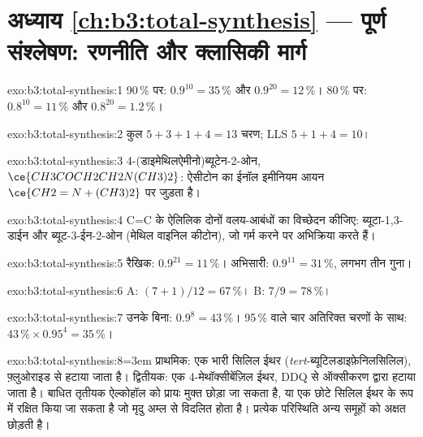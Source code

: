 \section*{अध्याय \ref{ch:b3:total-synthesis} --- पूर्ण संश्लेषण: रणनीति और क्लासिकी मार्ग}

\begin{solution}{exo:b3:total-synthesis:1}
90\,\% पर: $0.9^{10} = 35$\,\% और $0.9^{20} = 12$\,\%। 80\,\% पर: $0.8^{10} = 11$\,\% और $0.8^{20} = 1.2$\,\%।
\end{solution}

\begin{solution}{exo:b3:total-synthesis:2}
कुल $5 + 3 + 1 + 4 = 13$ चरण; LLS $5 + 1 + 4 = 10$।
\end{solution}

\begin{solution}{exo:b3:total-synthesis:3}
4-(डाइमेथिलऐमीनो)ब्यूटेन-2-ओन, $\ce{CH3COCH2CH2N(CH3)2}$: ऐसीटोन का ईनॉल इमीनियम
आयन $\ce{CH2=N+(CH3)2}$ पर जुड़ता है।
\end{solution}

\begin{solution}{exo:b3:total-synthesis:4}
C=C के ऐलिलिक दोनों वलय-आबंधों का विच्छेदन कीजिए: ब्यूटा-1,3-डाईन और ब्यूट-3-ईन-2-ओन
(मेथिल वाइनिल कीटोन), जो गर्म करने पर अभिक्रिया करते हैं।
\end{solution}

\begin{solution}{exo:b3:total-synthesis:5}
रैखिक: $0.9^{21} = 11$\,\%। अभिसारी: $0.9^{11} = 31$\,\%, लगभग तीन गुना।
\end{solution}

\begin{solution}{exo:b3:total-synthesis:6}
A: $(7 + 1)/12 = 67$\,\%। B: $7/9 = 78$\,\%।
\end{solution}

\begin{solution}{exo:b3:total-synthesis:7}
उनके बिना: $0.9^8 = 43$\,\%। 95\,\% वाले चार अतिरिक्त चरणों के साथ: $43\,\% \times 0.95^4 = 35$\,\%।
\end{solution}

\begin{solution}{exo:b3:total-synthesis:8}\emergencystretch=3em
प्राथमिक: एक भारी सिलिल ईथर (\textit{tert}-ब्यूटिलडाइफ़ेनिलसिलिल), फ़्लुओराइड से हटाया जाता है।
द्वितीयक: एक 4-मेथॉक्सीबेंज़िल ईथर, DDQ से ऑक्सीकरण द्वारा हटाया जाता है। बाधित
तृतीयक ऐल्कोहॉल को प्रायः मुक्त छोड़ा जा सकता है, या एक छोटे सिलिल ईथर के रूप में रक्षित
किया जा सकता है जो मृदु अम्ल से विदलित होता है। प्रत्येक परिस्थिति अन्य समूहों को अक्षत छोड़ती है।
\end{solution}

